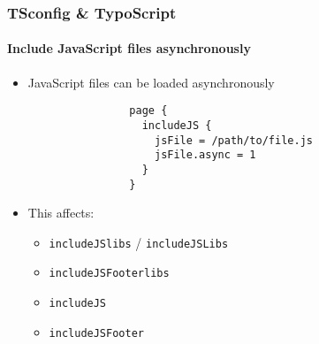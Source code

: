 
\begin{frame}[fragile]
	\frametitle{TSconfig \& TypoScript}
	\framesubtitle{Include JavaScript files asynchronously}

	\begin{itemize}
		\item JavaScript files can be loaded asynchronously

			\begin{lstlisting}
				page {
				  includeJS {
				    jsFile = /path/to/file.js
				    jsFile.async = 1
				  }
				}
			\end{lstlisting}

		\item This affects:

			\begin{itemize}
				\item \texttt{includeJSlibs} / \texttt{includeJSLibs}
				\item \texttt{includeJSFooterlibs}
				\item \texttt{includeJS}
				\item \texttt{includeJSFooter}
			\end{itemize}

	\end{itemize}

\end{frame}


